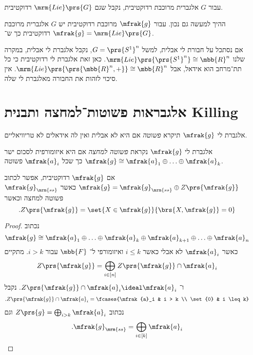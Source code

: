 \documentclass[10pt, twoside]{book}
\newcommand{\textenglish}[1]{\foreignlanguage{english}{#1}}
\newcommand{\Lie}{\mrm{Lie}}
\begin{document}
\begin{remark}
עבור
$G$
אלגברית מרוכבת רדוקטיבית, נקבל שגם
$\Lie\prs{G}$
רדוקטיבית.

ההיך למעשה גם נכון. עבור
$\mfrak{g}$
מרוכבת רדוקטיבית יש
$G$
אלגברית מרוכבת רדוקטיבית כך ש־%
$\mfrak{g} = \Lie\prs{G}$.
\end{remark}

\begin{remark}
אם נסתכל על חבורת לי אבלית, למשל
$G = \prs{S^1}^n$,
נקבל אלגברת לי אבלית, במקרה שלנו
$\Lie\prs{\prs{S^1}^n} \cong \mbb{R}^n$.
כאן זאת אלגברת לי רדוקטיבית כי כל תת־מרחב הוא אידאל, אבל
$\Lie\prs{\prs{\mbb{R}^n, +}} \cong \mbb{R}^n$.
אין סיכוי לזהות את החבורה מאלגברת לי שלה.
\end{remark}

\section{אלגבראות פשוטות־למחצה ותבנית
\textenglish{Killing}}

\begin{definition}
אלגברת לי
$\mfrak{g}$
תיקרא
\emph{פשוטה}
אם היא לא אבלית ואין לה אידאלים לא טריוויאליים.
\end{definition}

\begin{definition}
אלגברת לי
$\mfrak{g}$
נקראת
\emph{פשוטה למחצה}
אם היא איזומורפית לסכום ישר
$\mfrak{g} \cong \mfrak{a}_1 \oplus \ldots \oplus \mfrak{a}_k$
כך שכל
$\mfrak{a}_i$
פשוטה.
\end{definition}

\begin{corollary}
אם
$\mfrak{g}$
רדוקטיבית, אפשר לכתוב
$\mfrak{g} = \mfrak{g}_{\mrm{ss}} \oplus Z\prs{\mfrak{g}}$
כאשר
$\mfrak{g}_{\mrm{ss}}$
פשוטה למחצה וכאשר
\[\text{.} Z\prs{\mfrak{g}} = \set{X \in \mfrak{g}}{\brs{X,\mfrak{g}} = 0}\]
\end{corollary}

\begin{proof}
נכתוב
\[\mfrak{g} \cong \mfrak{a}_1 \oplus \ldots \oplus \mfrak{a}_k \oplus \mfrak{a}_{k+1} \oplus \ldots \oplus \mfrak{a}_n\]
כאשר
$\mfrak{a}_i$
לא אבלי כאשר
$i \leq k$
ואיזומורפי ל־%
$\mbb{F}$
עבור
$i > k$.
מתקיים
\[Z\prs{\mfrak{g}} = \bigoplus_{i \in [n]} Z\prs{\mfrak{g}} \cap \mfrak{a}_i\]
ו־%
$Z\prs{\mfrak{g}} \cap \mfrak{a}_i \ideal \mfrak{a}_i$.
נקבל
\begin{align*}
\text{.} Z\prs{\mfrak{g}} \cap \mfrak{a}_i = \fcases{\mfrak{a}_i & i > k \\ \set{0} & i \leq k}
\end{align*}
נכתוב
$Z\prs{g} = \bigoplus_{i > k} \mfrak{a}_i$
וגם
\[\text{.} \mfrak{g}_{\mrm{ss}} = \bigoplus_{i \in [k]} \mfrak{a}_i\]
\end{proof}
\end{document}
